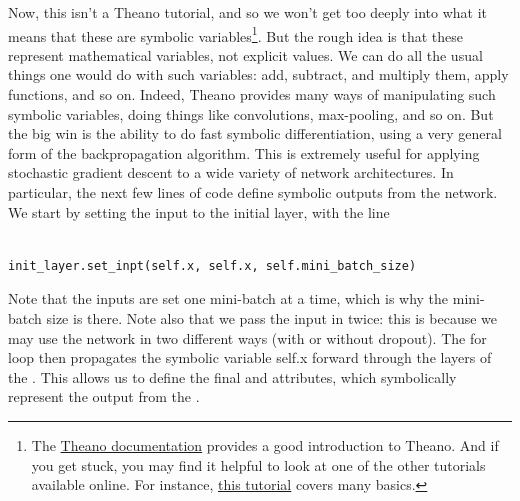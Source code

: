 \documentclass[a4paper,twoside,10pt]{book}
\begin{document}
Now, this isn't a Theano tutorial, and so we won't get too deeply into what it means that these are symbolic variables\footnote{The \href{http://deeplearning.net/software/theano/index.html}{Theano documentation} provides a good introduction to Theano. And if you get stuck, you may find it helpful to look at one of the other tutorials available online. For instance, \href{http://nbviewer.ipython.org/github/craffel/theano-tutorial/blob/master/Theano\%20Tutorial.ipynb}{this tutorial} covers many basics.}. But the rough idea is that these represent mathematical variables, not explicit values. We can do all the usual things one would do with such variables: add, subtract, and multiply them, apply functions, and so on. Indeed, Theano provides many ways of manipulating such symbolic variables, doing things like convolutions, max-pooling, and so on. But the big win is the ability to do fast symbolic differentiation, using a very general form of the backpropagation algorithm. This is extremely useful for applying stochastic gradient descent to a wide variety of network architectures. In particular, the next few lines of code define symbolic outputs from the network. We start by setting the input to the initial layer, with the line
\begin{lstlisting}

init_layer.set_inpt(self.x, self.x, self.mini_batch_size)

\end{lstlisting}
Note that the inputs are set one mini-batch at a time, which is why the mini-batch size is there. Note also that we pass the input  in twice: this is because we may use the network in two different ways (with or without dropout). The for loop then propagates the symbolic variable self.x forward through the layers of the . This allows us to define the final  and  attributes, which symbolically represent the output from the .
\end{document}
